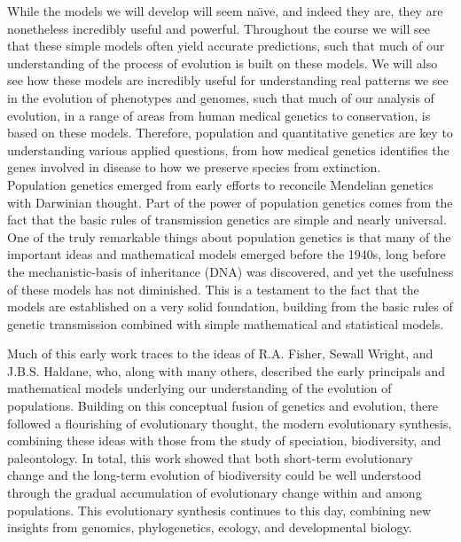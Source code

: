 
While the models we will develop will seem na\"{\i}ve, and indeed they are, they are
nonetheless incredibly useful and powerful. Throughout the course we will see
that these simple models often yield accurate predictions, such that much of our
understanding of the process of evolution is built on these models. We will
also see how these models are incredibly useful for understanding real patterns
we see in the evolution of phenotypes and genomes, such that much of our
analysis of evolution, in a range of areas from human medical genetics to conservation,
is based on these models. Therefore, population and quantitative genetics are key to
understanding various applied questions, from how medical genetics identifies
the genes involved in disease to how we preserve species from extinction. \\

Population genetics emerged from early efforts to
reconcile Mendelian genetics with Darwinian thought.
Part of the power of
population genetics comes from the fact that the basic rules of
transmission genetics are simple and nearly universal.  One of the truly remarkable things about population genetics is that
many of the important ideas and mathematical models emerged before the
1940s, long before the
mechanistic-basis of inheritance (DNA) was discovered, and yet the
usefulness of these models has not diminished. This is a testament to
the fact that the models are established on a very solid foundation,
building from the basic rules of genetic transmission combined with
simple mathematical and statistical models.

Much of this early work traces to the ideas of R.A. Fisher, Sewall Wright, and J.B.S. Haldane, who, along with many others, described the early principals and mathematical models underlying our understanding of the evolution of populations. Building on this conceptual fusion of genetics and evolution, there followed a flourishing of evolutionary thought, the modern evolutionary synthesis, combining these ideas with those from the study of speciation, biodiversity, and paleontology. In total, this work showed that both short-term evolutionary change and the long-term evolution of biodiversity could be well understood through the gradual accumulation of evolutionary change within and among populations. This evolutionary synthesis continues to this day, combining new insights from genomics, phylogenetics, ecology, and developmental biology.

